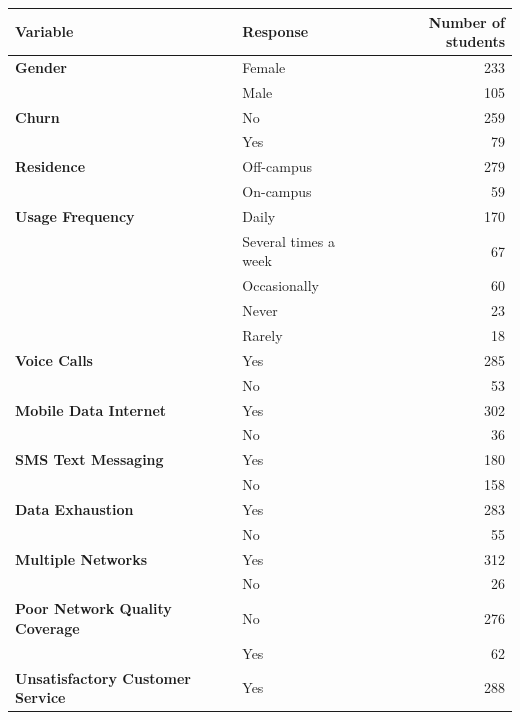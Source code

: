 \documentclass[doublespacing,12pt]{report}
\begin{document}
\begin{table}[H]
    \centering

    \begin{tabular}{llr}
        \toprule
        \textbf{Variable} & \textbf{Response} & \textbf{Number of students} \\
        \midrule
        \textbf{Gender} & Female & 233 \\
                        & Male & 105 \\
        \midrule
        \textbf{Churn} & No & 259 \\
                       & Yes & 79 \\
        \midrule
        \textbf{Residence} & Off-campus & 279 \\
                           & On-campus & 59 \\
        \midrule
        \textbf{Usage Frequency} & Daily & 170 \\
                                 & Several times a week & 67 \\
                                 & Occasionally & 60 \\
                                 & Never & 23 \\
                                 & Rarely & 18 \\
        \midrule
        \textbf{Voice Calls} & Yes & 285 \\
                             & No & 53 \\
        \midrule
        \textbf{Mobile Data Internet} & Yes & 302 \\
                                      & No & 36 \\
        \midrule
        \textbf{SMS Text Messaging} & Yes & 180 \\
                                     & No & 158 \\
        \midrule
        \textbf{Data Exhaustion} & Yes & 283 \\
                                  & No & 55 \\
        \midrule
        \textbf{Multiple Networks} & Yes & 312 \\
                                    & No & 26 \\
        \midrule
        \textbf{Poor Network Quality Coverage} & No & 276 \\
                                               & Yes & 62 \\
        \midrule
        \textbf{Unsatisfactory Customer Service} & Yes & 288 \\

\end{tabular}
\end{table}
\end{document}
